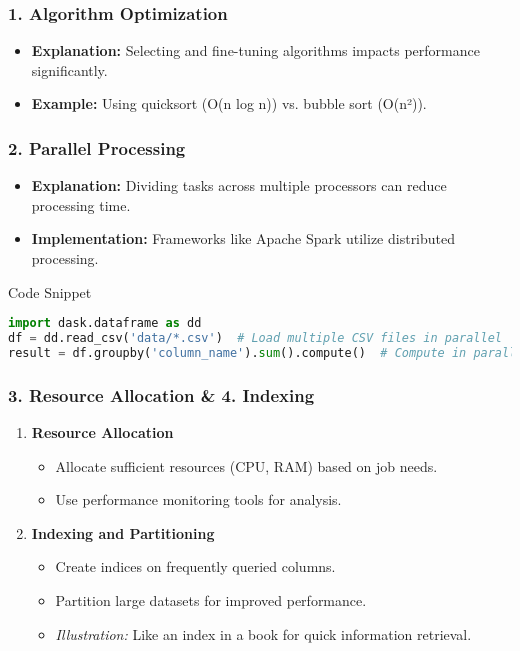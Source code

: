 \documentclass{beamer}
\begin{document}
\begin{frame}[fragile]
    \frametitle{1. Algorithm Optimization}
    \begin{itemize}
        \item \textbf{Explanation:} Selecting and fine-tuning algorithms impacts performance significantly.
        \item \textbf{Example:} Using quicksort (O(n log n)) vs. bubble sort (O(n²)).
    \end{itemize}
\end{frame}

\begin{frame}[fragile]
    \frametitle{2. Parallel Processing}
    \begin{itemize}
        \item \textbf{Explanation:} Dividing tasks across multiple processors can reduce processing time.
        \item \textbf{Implementation:} Frameworks like Apache Spark utilize distributed processing.
    \end{itemize}
    \begin{block}{Code Snippet}
    \begin{lstlisting}[language=Python]
import dask.dataframe as dd
df = dd.read_csv('data/*.csv')  # Load multiple CSV files in parallel
result = df.groupby('column_name').sum().compute()  # Compute in parallel
    \end{lstlisting}
    \end{block}
\end{frame}

\begin{frame}[fragile]
    \frametitle{3. Resource Allocation & 4. Indexing}
    \begin{enumerate}
        \item \textbf{Resource Allocation}
            \begin{itemize}
                \item Allocate sufficient resources (CPU, RAM) based on job needs.
                \item Use performance monitoring tools for analysis.
            \end{itemize}
        \item \textbf{Indexing and Partitioning}
            \begin{itemize}
                \item Create indices on frequently queried columns.
                \item Partition large datasets for improved performance.
                \item \textit{Illustration:} Like an index in a book for quick information retrieval.
            \end{itemize}
    \end{enumerate}
\end{frame}
\end{document}
